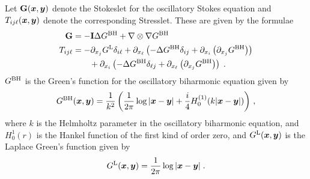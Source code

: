 Let ${\bf G}({\boldsymbol x},{\boldsymbol y})$ denote the Stokeslet for the oscillatory
Stokes equation and $T_{ij\ell}({\boldsymbol x},{\boldsymbol y})$ denote the corresponding
Stresslet. 
These are given by the formulae
\begin{align} 
  {\bf G} &= - {\bf I} \Delta G^{\textrm{BH}} + \nabla \otimes \nabla G^{\textrm{BH}} 
\label{eq:ostokeslet} \\
  T_{ij\ell} &= - \partial_{x_j} G^{\textrm{L}} \delta_{i\ell}
  + \partial_{x_\ell} \left ( -\Delta G^{\textrm{BH}} \delta_{ij} +
  \partial_{x_i} \left(\partial_{x_j} G^{\textrm{BH}} \right) \right)
  \nonumber \\
  & \qquad+ \partial_{x_i} \left ( -\Delta G^{\textrm{BH}} \delta_{\ell j} +
  \partial_{x_\ell} \left(\partial_{x_j} G^{\textrm{BH}} \right) \right)
  \; . \label{eq:ostress} 
\end{align}
$G^{\textrm{BH}}$ is the Green's function for the oscillatory
biharmonic equation given by
\begin{equation}
  G^{\textrm{BH}}({\boldsymbol x},{\boldsymbol y}) = \frac{1}{k^2}
  \left (\frac{1}{2\pi} \log |{\boldsymbol x}-{\boldsymbol y}| +
  \frac{i}{4} H_0^{(1)}(k|{\boldsymbol x}-{\boldsymbol y}|) \right ) \, ,
  \label{eq:Gbh}
\end{equation}
where $k$ is the Helmholtz parameter in the oscillatory biharmonic equation,
and $H_{0}^{1}(r)$ is the Hankel function of the first kind of order zero,
and $G^{\textrm{L}}({\boldsymbol x},{\boldsymbol y})$ is the Laplace Green's function given by
\begin{equation}
  G^{\textrm{L}}({\boldsymbol x},{\boldsymbol y}) = \frac{1}{2\pi} \log |{\boldsymbol x}-{\boldsymbol y}| \; . \nonumber
\end{equation}


